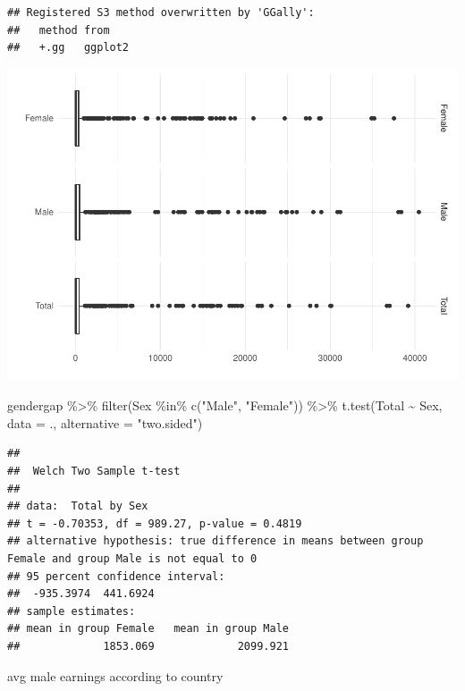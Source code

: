 \documentclass[
]{article}
\newenvironment{Shaded}{\begin{snugshade}}{\end{snugshade}}
\newcommand{\AttributeTok}[1]{\textcolor[rgb]{0.77,0.63,0.00}{#1}}
\newcommand{\FunctionTok}[1]{\textcolor[rgb]{0.00,0.00,0.00}{#1}}
\newcommand{\NormalTok}[1]{#1}
\newcommand{\SpecialCharTok}[1]{\textcolor[rgb]{0.00,0.00,0.00}{#1}}
\newcommand{\StringTok}[1]{\textcolor[rgb]{0.31,0.60,0.02}{#1}}
\begin{document}
\begin{verbatim}
## Registered S3 method overwritten by 'GGally':
##   method from   
##   +.gg   ggplot2
\end{verbatim}

\includegraphics{Data-Analysis_files/figure-latex/unnamed-chunk-3-1.pdf}

\begin{Shaded}
\begin{Highlighting}[]
\NormalTok{gendergap }\SpecialCharTok{\%\textgreater{}\%}
\FunctionTok{filter}\NormalTok{(Sex }\SpecialCharTok{\%in\%} \FunctionTok{c}\NormalTok{(}\StringTok{"Male"}\NormalTok{, }\StringTok{"Female"}\NormalTok{)) }\SpecialCharTok{\%\textgreater{}\%}
\FunctionTok{t.test}\NormalTok{(Total }\SpecialCharTok{\textasciitilde{}}\NormalTok{ Sex, }\AttributeTok{data =}\NormalTok{ ., }\AttributeTok{alternative =} \StringTok{"two.sided"}\NormalTok{)}
\end{Highlighting}
\end{Shaded}

\begin{verbatim}
## 
##  Welch Two Sample t-test
## 
## data:  Total by Sex
## t = -0.70353, df = 989.27, p-value = 0.4819
## alternative hypothesis: true difference in means between group Female and group Male is not equal to 0
## 95 percent confidence interval:
##  -935.3974  441.6924
## sample estimates:
## mean in group Female   mean in group Male 
##             1853.069             2099.921
\end{verbatim}

avg male earnings according to country
\end{document}
